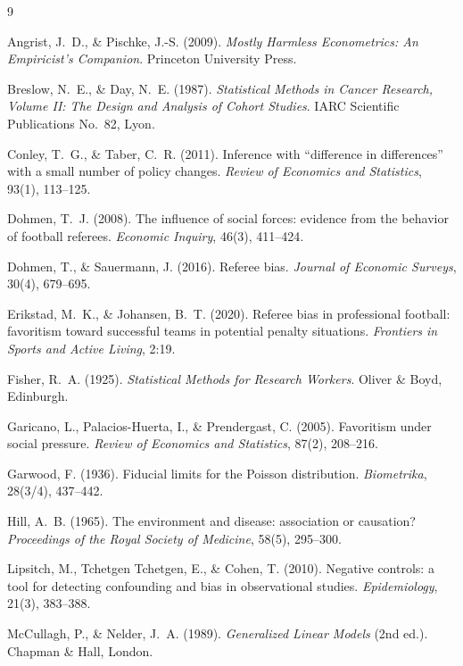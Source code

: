 \documentclass[11pt,a4paper]{article}
\begin{document}
\begin{thebibliography}{9}

Angrist, J.~D., \& Pischke, J.-S. (2009).
\emph{Mostly Harmless Econometrics: An Empiricist's Companion}.
Princeton University Press.

Breslow, N.~E., \& Day, N.~E. (1987).
\emph{Statistical Methods in Cancer Research, Volume II: The Design and Analysis of
Cohort Studies}. IARC Scientific Publications No.~82, Lyon.

Conley, T.~G., \& Taber, C.~R. (2011).
Inference with ``difference in differences'' with a small number of policy changes.
\emph{Review of Economics and Statistics}, 93(1), 113--125.

Dohmen, T.~J. (2008).
The influence of social forces: evidence from the behavior of football referees.
\emph{Economic Inquiry}, 46(3), 411--424.

Dohmen, T., \& Sauermann, J. (2016).
Referee bias.
\emph{Journal of Economic Surveys}, 30(4), 679--695.

Erikstad, M.~K., \& Johansen, B.~T. (2020).
Referee bias in professional football: favoritism toward successful teams in
potential penalty situations.
\emph{Frontiers in Sports and Active Living}, 2:19.

Fisher, R.~A. (1925).
\emph{Statistical Methods for Research Workers}.
Oliver \& Boyd, Edinburgh.

Garicano, L., Palacios-Huerta, I., \& Prendergast, C. (2005).
Favoritism under social pressure.
\emph{Review of Economics and Statistics}, 87(2), 208--216.

Garwood, F. (1936).
Fiducial limits for the Poisson distribution.
\emph{Biometrika}, 28(3/4), 437--442.

Hill, A.~B. (1965).
The environment and disease: association or causation?
\emph{Proceedings of the Royal Society of Medicine}, 58(5), 295--300.

Lipsitch, M., Tchetgen Tchetgen, E., \& Cohen, T. (2010).
Negative controls: a tool for detecting confounding and bias in observational
studies.
\emph{Epidemiology}, 21(3), 383--388.

McCullagh, P., \& Nelder, J.~A. (1989).
\emph{Generalized Linear Models} (2nd ed.).
Chapman \& Hall, London.


\end{thebibliography}
\end{document}
